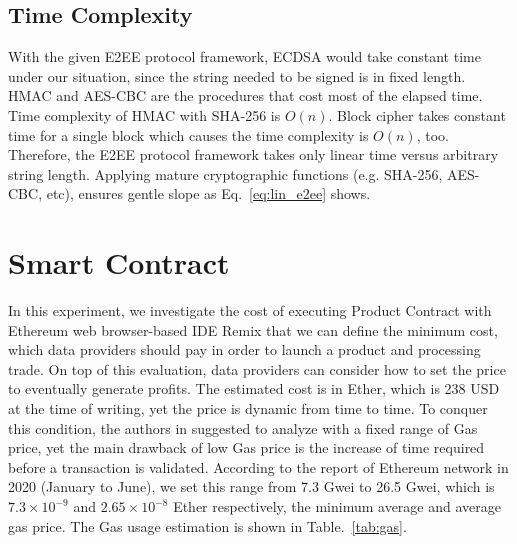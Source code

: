 \begin{spacing}{2.0}
\subsection{Time Complexity}
With the given E2EE protocol framework, ECDSA would take constant time under our situation, since the string needed to be signed is in fixed length. HMAC and AES-CBC are the procedures that cost most of the elapsed time. Time complexity of HMAC with SHA-256 is $O(n)$.\cite{hmac_time_complexity} Block cipher takes constant time for a single block which causes the time complexity is $O(n)$, too. Therefore, the E2EE protocol framework takes only linear time versus arbitrary string length. Applying mature cryptographic functions (e.g. SHA-256, AES-CBC, etc), ensures gentle slope as Eq.~\ref{eq:lin_e2ee} shows.
\clearpage

\section{Smart Contract}
In this experiment, we investigate the cost of executing Product Contract with Ethereum web browser-based IDE Remix that we can define the minimum cost, which data providers should pay in order to launch a product and processing trade.  On top of this evaluation, data providers can consider how to set the price to eventually generate profits. The estimated cost is in Ether, which is 238 USD at the time of writing, yet the price is dynamic from time to time. To conquer this condition, the authors in \cite{MindMyValue} suggested to analyze with a fixed range of Gas price,  yet the main drawback of low Gas price is the increase of time required before a transaction is validated. According to the report of Ethereum network\cite{ethereumChart} in 2020 (January to June), we set this range from 7.3 Gwei to 26.5 Gwei, which is $7.3 \times 10^{-9}$ and $2.65 \times 10^{-8}$ Ether respectively, the minimum average and average gas price. The Gas usage estimation is shown in Table.~\ref{tab:gas}.

\begin{table}[h]
	\caption{Gas consumption for each function of Product Contract}
	\label{tab:gas}
	\centering
\end{table}


\end{spacing}
